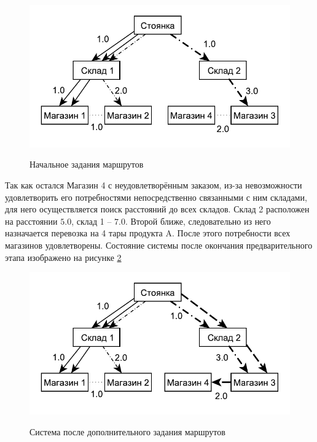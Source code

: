	\begin{figure}[h]
		\begin{center}
			{\includegraphics[scale=1.0, angle=0]{img/max_elem_2.pdf}}
			\caption{Начальное задания маршрутов}
			\label{pic:pre_2}
		\end{center}
	\end{figure}

	Так как остался Магазин 4 с неудовлетворённым заказом, из-за невозможности удовлетворить его потребностями непосредственно связанными с ним складами, для него осуществляется поиск расстояний до всех складов. Склад 2 расположен на расстоянии $5.0$, склад 1 -- $7.0$. Второй ближе, следовательно из него назначается перевозка на 4 тары продукта A. После этого потребности всех магазинов удовлетворены. Состояние системы после окончания предварительного этапа изображено на рисунке \ref{pic:pre_3}
	
 	\begin{figure}[h]
	 	\begin{center}
	 		{\includegraphics[scale=1.0, angle=0]{img/max_elem_3.pdf}}
	 		\caption{Система после дополнительного задания маршрутов}
	 		\label{pic:pre_3}
	 	\end{center}
	 \end{figure}
 
